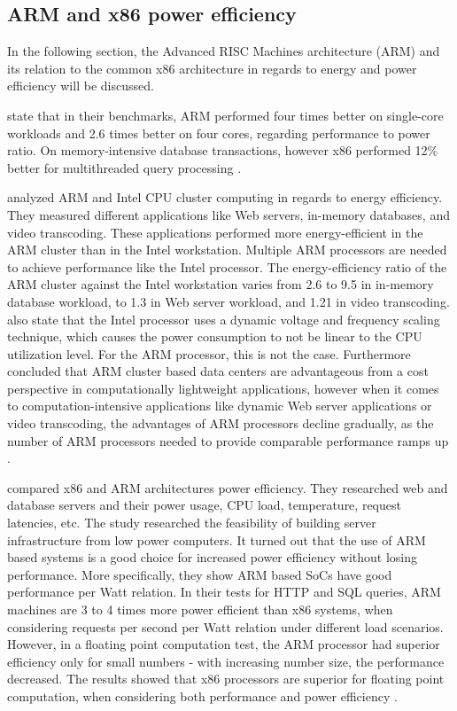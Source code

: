 \subsection{ARM and x86 power efficiency}

In the following section, the Advanced RISC Machines architecture (ARM)
and its relation to the common x86 architecture in regards to 
energy and power efficiency will be discussed.

\citeauthor{maqbool2015evaluating} \cite{maqbool2015evaluating}
state that in their benchmarks,
ARM performed four times better on single-core workloads and
2.6 times better on four cores, 
regarding performance to power ratio.
On memory-intensive database transactions, however
x86 performed 12\% better for multithreaded query processing
\cite{maqbool2015evaluating}.

\citeauthor{ou2012energy} \cite{ou2012energy} 
analyzed ARM and Intel CPU cluster computing 
in regards to energy efficiency. They measured different applications
like Web servers, in-memory databases, and video transcoding. These
applications performed more energy-efficient in the ARM cluster than 
in the Intel workstation. Multiple ARM processors are needed to 
achieve performance like the Intel processor. 
The energy-efficiency ratio of the
ARM cluster against the Intel workstation varies from 2.6  to 9.5 in
in-memory database workload, to 1.3 in Web server workload, and 
1.21 in video transcoding. 
\citeauthor{ou2012energy} \cite{ou2012energy} also state that the Intel processor
uses a dynamic voltage and frequency scaling technique, which 
causes the power consumption to not be linear to the CPU utilization level.
For the ARM processor, this is not the case.
Furthermore \citeauthor{ou2012energy} \cite{ou2012energy} concluded that ARM cluster 
based data centers are advantageous from a cost perspective
in computationally lightweight applications,
however when it comes to computation-intensive applications
like dynamic Web server applications or video transcoding, the advantages
of ARM processors decline gradually, as the number of ARM processors needed 
to provide comparable performance ramps up
\cite{ou2012energy}.

\citeauthor{aroca2012towards} \cite{aroca2012towards}
compared x86 and ARM architectures power efficiency.
They researched web and database servers and their power usage, CPU load,
temperature, request latencies, etc.
The study researched the feasibility of building server infrastructure
from low power computers. It turned out that the use of ARM based systems
is a good choice for increased power efficiency without losing performance.
More specifically, they show ARM based SoCs have good performance per Watt relation.
In their tests for HTTP and SQL queries, ARM machines are 3 to 4 times
more power efficient than x86 systems, when considering 
requests per second per Watt relation under different load scenarios.
However, in a floating point computation test, the ARM processor had 
superior efficiency only for small numbers - with increasing number size,
the performance decreased. The results showed that x86 processors are superior
for floating point computation, when considering both performance and 
power efficiency
\cite{aroca2012towards}.


